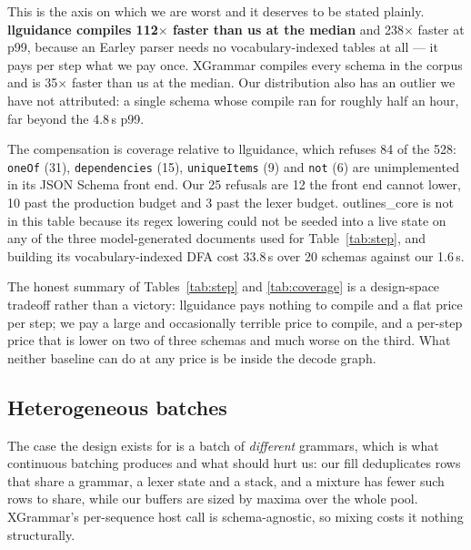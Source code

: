 \documentclass{article}
\begin{document}
This is the axis on which we are worst and it deserves to be stated plainly.
\textbf{llguidance compiles 112$\times$ faster than us at the median} and
238$\times$ faster at p99, because an Earley parser needs no vocabulary-indexed
tables at all --- it pays per step what we pay once. XGrammar compiles every
schema in the corpus and is 35$\times$ faster than us at the median. Our
distribution also has an outlier we have not attributed: a single schema whose
compile ran for roughly half an hour, far beyond the 4.8\,s p99.

The compensation is coverage relative to llguidance, which refuses 84 of the
528: \texttt{oneOf} (31), \texttt{dependencies} (15), \texttt{uniqueItems} (9)
and \texttt{not} (6) are unimplemented in its JSON Schema front end. Our 25
refusals are 12 the front end cannot lower, 10 past the production budget and
3 past the lexer budget. outlines\_core is not in this table because its
regex lowering could not be seeded into a live state on any of the three
model-generated documents used for Table~\ref{tab:step}, and building its
vocabulary-indexed DFA cost 33.8\,s over 20 schemas against our 1.6\,s.

The honest summary of Tables~\ref{tab:step} and \ref{tab:coverage} is a
design-space tradeoff rather than a victory: llguidance pays nothing to compile
and a flat price per step; we pay a large and occasionally terrible price to
compile, and a per-step price that is lower on two of three schemas and much
worse on the third. What neither baseline can do at any price is be inside the
decode graph.

\subsection{Heterogeneous batches}
\label{sec:eval-mixed}

The case the design exists for is a batch of \emph{different} grammars, which is
what continuous batching produces and what should hurt us: our fill deduplicates
rows that share a grammar, a lexer state and a stack, and a mixture has fewer
such rows to share, while our buffers are sized by maxima over the whole pool.
XGrammar's per-sequence host call is schema-agnostic, so mixing costs it nothing
structurally.
\end{document}
